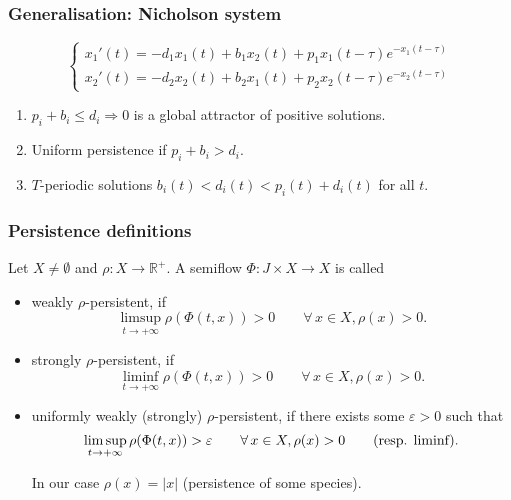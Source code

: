 \documentclass{beamer}
\def\R{\mathbb{R}}
\begin{document}
\begin{frame}
\frametitle{Generalisation: Nicholson system}

\begin{equation}
    \label{nich-sys}
    \left\{\begin{array}{c}
        x_1'(t)=-d_1 x_1(t) + b_1x_2(t)+ p_1 x_1(t-\tau)e^{-x_1(t-\tau)}    \\
               x_2'(t)=-d_2 x_2(t) + b_2x_1(t)+ p_2 x_2(t-\tau)e^{-x_2(t-\tau)}  
    \end{array}
    \right.
    \end{equation}

\begin{enumerate}
    \item $p_i+b_i\le d_i\Longrightarrow 0$ is a global attractor of positive solutions. 
        \item Uniform persistence if $p_i+b_i>d_i$.
        
        \item $T$-periodic solutions $b_i(t)<d_i(t) <p_i(t)+d_i(t)$ for all $t$. 
        
    
\end{enumerate}
\end{frame}




\begin{frame}

\frametitle{Persistence definitions}

Let $X\ne \emptyset$ and 
$\rho: X \to \R^+$. A semiflow $\Phi : J \times X \to  X$ is called 



\begin{itemize}
    \item weakly $\rho$-persistent, if
$$\limsup_{t\to+\infty}  
\rho(\Phi(t, x)) > 0\qquad \forall\, x \in  X, \rho(x) > 0.$$
    
    \item 
     strongly $\rho$-persistent, if
$$\liminf_{t\to+\infty}  
\rho(\Phi(t, x)) > 0\qquad \forall\, x \in  X, \rho(x) > 0.$$
\item 
uniformly weakly (strongly) $\rho$-persistent, if
there exists some  $\varepsilon > 0$ such that
$$\limsup_{t\to+\infty}  
\rho(\Phi(t, x)) > \varepsilon \qquad \forall\, x \in  X, \rho(x) > 0\qquad \hbox{(resp. liminf)}.$$
 

\medskip
In our case 
$\rho(x) = |x|$ (persistence of some  species).

\end{itemize}

\end{frame}
\end{document}
